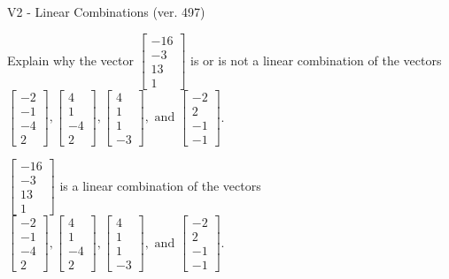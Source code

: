 \begin{exercise}
  \begin{exerciseTitle}V2 - Linear Combinations (ver. 497)\end{exerciseTitle}
  \begin{exerciseStatement}
    Explain why the vector \(\left[\begin{array}{c}
-16 \\
-3 \\
13 \\
1
\end{array}\right]\)  is or is not a linear 
	combination of the vectors \(\left[\begin{array}{c}
-2 \\
-1 \\
-4 \\
2
\end{array}\right] , \left[\begin{array}{c}
4 \\
1 \\
-4 \\
2
\end{array}\right] , \left[\begin{array}{c}
4 \\
1 \\
1 \\
-3
\end{array}\right] , \text{ and } \left[\begin{array}{c}
-2 \\
2 \\
-1 \\
-1
\end{array}\right]\).
	


  \end{exerciseStatement}
  \begin{exerciseAnswer}
   \(\left[\begin{array}{c}
-16 \\
-3 \\
13 \\
1
\end{array}\right]\) 
  	 is  
	a linear combination of the vectors \(\left[\begin{array}{c}
-2 \\
-1 \\
-4 \\
2
\end{array}\right] , \left[\begin{array}{c}
4 \\
1 \\
-4 \\
2
\end{array}\right] , \left[\begin{array}{c}
4 \\
1 \\
1 \\
-3
\end{array}\right] , \text{ and } \left[\begin{array}{c}
-2 \\
2 \\
-1 \\
-1
\end{array}\right]\).


\end{exerciseAnswer}
\end{exercise}
